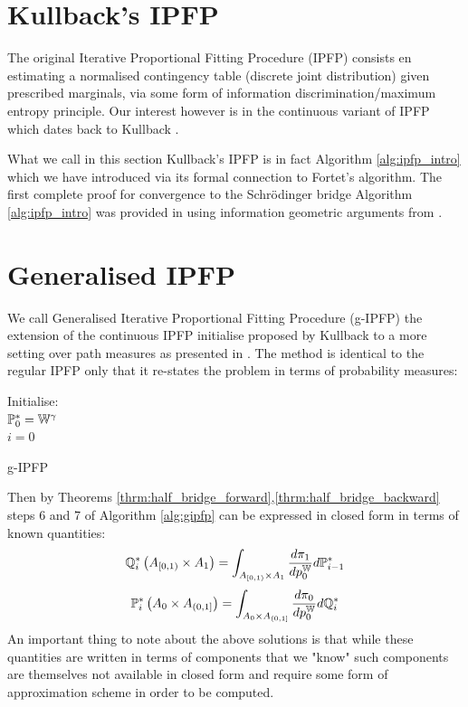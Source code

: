 \documentclass[a4paper,12pt,twoside,openright]{report}
\theoremstyle{definition}
\begin{document}
\section{Kullback's IPFP}
The original Iterative Proportional Fitting Procedure (IPFP) consists en estimating a normalised contingency table (discrete joint distribution) given prescribed marginals, via some form of information discrimination/maximum entropy principle. Our interest however is in the continuous variant of IPFP which dates back to Kullback \citep{kullback1968probability}.

What we call in this section Kullback's IPFP is in fact Algorithm \ref{alg:ipfp_intro} which we have introduced via its formal connection to Fortet's algorithm.  The first complete proof for convergence to the  Schrödinger bridge Algorithm \ref{alg:ipfp_intro} was provided in \cite{ruschendorf1995convergence} using information geometric arguments from \cite{csiszar1975divergence}.


\section{Generalised IPFP}

We call Generalised Iterative Proportional Fitting Procedure (g-IPFP) the extension of the continuous IPFP initialise proposed by Kullback to a more setting over path measures as presented in \cite{cramer2000probability, bernton2019schr}. The method is identical to the regular IPFP only that it re-states the problem in terms of probability measures:
\begin{algorithm} \label{alg:gipfp}
Initialise:\\
${\mathbb{P}}^{*}_0 =\mathbb{W}^{\gamma}$\\
$i=0$ \\
\caption{g-IPFP \citep{cramer2000probability} }
\end{algorithm}

Then by Theorems \ref{thrm:half_bridge_forward},\ref{thrm:half_bridge_backward} steps 6 and 7 of Algorithm \ref{alg:gipfp} can be expressed in closed form in terms of known quantities:
\begin{align}
    {{\mathbb{Q}}}^{*}_i\left( A_{[0,1)} \times A_1\right) =  \int_{ A_{[0,1)} \times A_1}  \frac{d \pi_1}{ d p_0^{\mathbb{W}}} d{\mathbb{P}}^{*}_{i-1}
\end{align}
\begin{align}
    {{\mathbb{P}}}^{*}_i\left(A_0 \times A_{(0,1]}\right) =  \int_{A_0\times A_{(0,1]}} \frac{d \pi_0}{ dp_0^{\mathbb{W}}} d{\mathbb{Q}}^{*}_i
\end{align}
An important thing to note about the above solutions is that while these quantities are written in terms of components that we "know" such components are themselves not available in closed form and require some form of approximation scheme in order to be computed.
\end{document}

